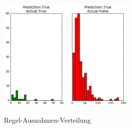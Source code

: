 \begin{figure}[!ht]
	\center
	\includegraphics[width=0.6\textwidth]{Bilder/exception_hist.png}\\
	\caption{Regel-Ausnahmen-Verteilung}
	\label{fig:RAV}
\end{figure}

